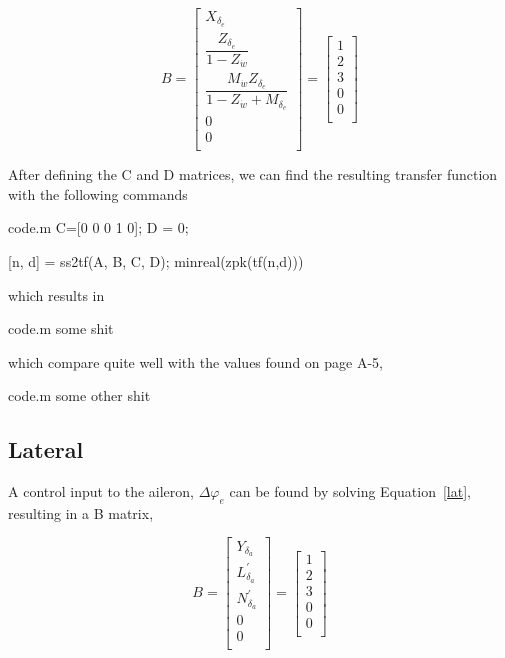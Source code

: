 \documentclass[12pt]{article}
\begin{document}
\begin{equation*}
B =
\begin{bmatrix}
   X_{\delta_e} \\
   \dfrac{Z_{\delta_e}}{1-Z_{\dot{w}}} \\
   \dfrac{M_{\dot{w}} Z_{\delta_e}}{1-Z_{\dot{w}} + M_{\delta_e}} \\
   0 \\
   0 \\
\end{bmatrix}
=
\begin{bmatrix}
   1 \\
   2 \\
   3 \\
   0 \\
   0 \\
\end{bmatrix}
\end{equation*}

\noindent After defining the C and D matrices, we can find the resulting transfer function with the following commands
\begin{filecontents*}{code.m}
C=[0 0 0 1 0];
D = 0;

[n, d] = ss2tf(A, B, C, D);
minreal(zpk(tf(n,d)))
\end{filecontents*}


\noindent which results in
\begin{filecontents*}{code.m}
some shit
\end{filecontents*}


\noindent which compare quite well with the values found on page A-5,

\begin{filecontents*}{code.m}
some other shit
\end{filecontents*}


\subsection{Lateral}
\noindent A control input to the aileron, $\Delta \varphi_e$ can be found by solving Equation~\ref{lat}, resulting in a B matrix,

\begin{equation*}
B =
\begin{bmatrix}
   Y_{\delta_a} \\
   L_{\delta_a}^\prime \\
   N_{\delta_a}^\prime \\
   0 \\
   0 \\
\end{bmatrix}
=
\begin{bmatrix}
   1 \\
   2 \\
   3 \\
   0 \\
   0 \\
\end{bmatrix}
\end{equation*}
\end{document}
